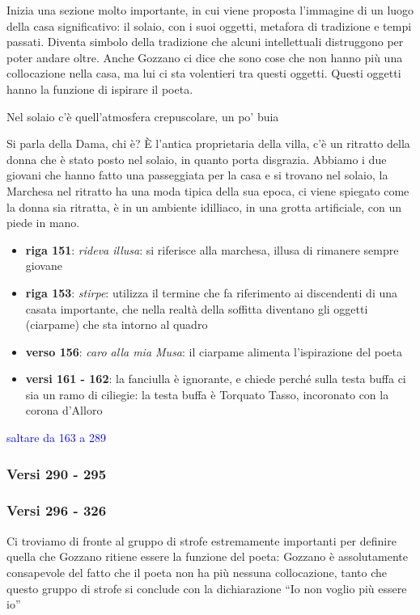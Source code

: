 \documentclass[a4paper, twoside, titlepage]{book}
\newcounter{mar}
\newcommand{\elenco}[1]{%
\begin{itemize}
#1
\end{itemize}}
\renewcommand{\emph}[1]{\textcolor{blue}{#1}}
\begin{document}
Inizia una sezione molto importante, in cui viene proposta l’immagine di un luogo della casa significativo: il solaio, con i suoi oggetti, metafora di tradizione e tempi passati.
Diventa simbolo della tradizione che alcuni intellettuali distruggono per poter andare oltre. Anche Gozzano ci dice che sono cose che non hanno più una collocazione nella casa, ma lui ci sta volentieri tra questi oggetti.
Questi oggetti hanno la funzione di ispirare il poeta.

Nel solaio c’è quell’atmosfera crepuscolare, un po’ buia

Si parla della Dama, chi è? È l’antica proprietaria della villa, c’è un ritratto della donna che è stato posto nel solaio, in quanto porta disgrazia. Abbiamo i due giovani che hanno fatto una passeggiata per la casa e si trovano nel solaio, la Marchesa nel ritratto ha una moda tipica della sua epoca, ci viene spiegato come la donna sia ritratta, è in un ambiente idilliaco, in una grotta artificiale, con un piede in mano.

\elenco{
	\item \textbf{riga 151}: \textit{rideva illusa}: si riferisce alla marchesa, illusa di rimanere sempre giovane
	\item \textbf{riga 153}: \textit{stirpe}: utilizza il termine che fa riferimento ai discendenti di una casata importante, che nella realtà della soffitta diventano gli oggetti (ciarpame) che sta intorno al quadro
	\item \textbf{verso 156}: \textit{caro alla mia Musa}: il ciarpame alimenta l’ispirazione del poeta
	\item \textbf{versi 161 - 162}: la fanciulla è ignorante, e chiede perché sulla testa buffa ci sia un ramo di ciliegie: la testa buffa è Torquato Tasso, incoronato con la corona d’Alloro}

\emph{saltare da 163 a 289}

\subsubsection{Versi 290 - 295}

\subsubsection{Versi 296 - 326}

Ci troviamo di fronte al gruppo di strofe estremamente importanti per definire quella che Gozzano ritiene essere la funzione del poeta: Gozzano è assolutamente consapevole del fatto che il poeta non ha più nessuna collocazione, tanto che questo gruppo di strofe si conclude con la dichiarazione “Io non voglio più essere io”
\end{document}
